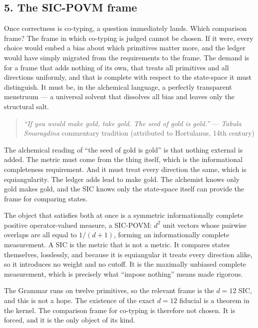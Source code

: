 \documentclass[12pt,a4paper]{article}
\begin{document}
\hypertarget{the-sic-povm-frame}{%
\subsection{5. The SIC-POVM frame}\label{the-sic-povm-frame}}

Once correctness is co-typing, a question immediately lands. Which
comparison frame? The frame in which co-typing is judged cannot be
chosen. If it were, every choice would embed a bias about which
primitives matter more, and the ledger would have simply migrated from
the requirements to the frame. The demand is for a frame that adds
nothing of its own, that treats all primitives and all directions
uniformly, and that is complete with respect to the state-space it must
distinguish. It must be, in the alchemical language, a perfectly
transparent menstruum --- a universal solvent that dissolves all bias
and leaves only the structural salt.

\begin{quote}
\emph{``If you would make gold, take gold. The seed of gold is gold.''}
--- \emph{Tabula Smaragdina} commentary tradition (attributed to
Hortulanus, 14th century)
\end{quote}

The alchemical reading of ``the seed of gold is gold'' is that nothing
external is added. The metric must come from the thing itself, which is
the informational completeness requirement. And it must treat every
direction the same, which is equiangularity. The ledger adds lead to
make gold. The alchemist knows only gold makes gold, and the SIC knows
only the state-space itself can provide the frame for comparing states.

The object that satisfies both at once is a symmetric informationally
complete positive operator-valued measure, a SIC-POVM: \({d^2}\) unit
vectors whose pairwise overlaps are all equal to \({1/(d+1)}\), forming
an informationally complete measurement. A SIC is the metric that is not
a metric. It compares states themselves, losslessly, and because it is
equiangular it treats every direction alike, so it introduces no weight
and no cutoff. It is the maximally unbiased complete measurement, which
is precisely what ``impose nothing'' means made rigorous.

The Grammar runs on twelve primitives, so the relevant frame is the
\({d=12}\) SIC, and this is not a hope. The existence of the exact
\({d=12}\) fiducial is a theorem in the kernel. The comparison frame for
co-typing is therefore not chosen. It is forced, and it is the only
object of its kind.
\end{document}
